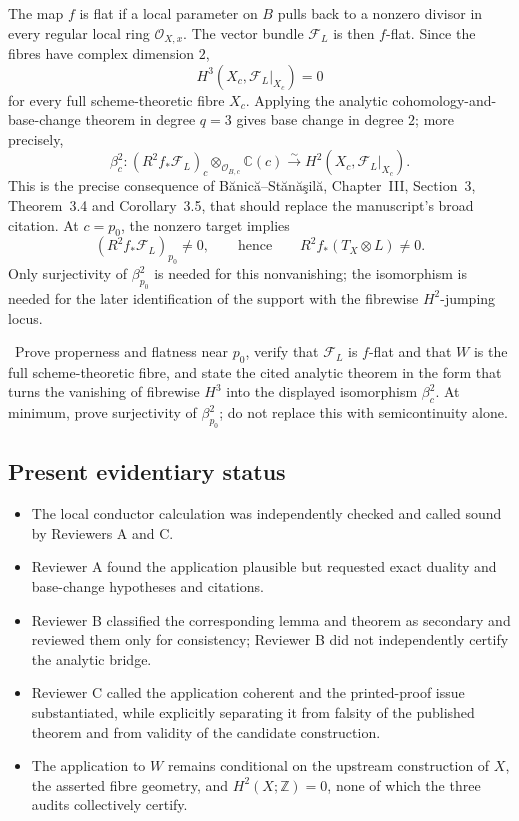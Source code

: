 The map $f$ is flat if a local parameter on $B$ pulls back to a nonzero
divisor in every regular local ring $\mathcal O_{X,x}$. The vector bundle
$\mathcal F_L$ is then $f$-flat. Since the fibres have complex dimension
$2$,
\[
 H^3(X_c,\mathcal F_L|_{X_c})=0
\]
for every full scheme-theoretic fibre $X_c$. Applying the analytic
cohomology-and-base-change theorem in degree $q=3$ gives base change in
degree $2$; more precisely,
\[
 \beta^2_c:
 (R^2f_*\mathcal F_L)_c\otimes_{\mathcal O_{B,c}}\mathbb C(c)
 \xrightarrow{\sim}
 H^2(X_c,\mathcal F_L|_{X_c}).
\]
This is the precise consequence of
B\u{a}nic\u{a}--St\u{a}n\u{a}\c{s}il\u{a}, Chapter~III,
Section~3, Theorem~3.4 and Corollary~3.5, that should replace the
manuscript's broad citation. At $c=p_0$, the nonzero target implies
\[
 (R^2f_*\mathcal F_L)_{p_0}\ne0,
 \qquad\text{hence}\qquad
 R^2f_*(T_X\otimes L)\ne0.
\]
Only surjectivity of $\beta^2_{p_0}$ is needed for this nonvanishing; the
isomorphism is needed for the later identification of the support with the
fibrewise $H^2$-jumping locus.

\begin{obligation}\label{obl:base-change}
\Open\ Prove properness and flatness near $p_0$, verify that
$\mathcal F_L$ is $f$-flat and that $W$ is the full scheme-theoretic
fibre, and state the cited analytic theorem in the form that turns the
vanishing of fibrewise $H^3$ into the displayed isomorphism $\beta^2_c$.
At minimum, prove surjectivity of $\beta^2_{p_0}$; do not replace this with
semicontinuity alone.
\end{obligation}

\subsection{Present evidentiary status}

\begin{itemize}
\item The local conductor calculation was independently checked and called
sound by Reviewers A and C.
\item Reviewer A found the application plausible but requested exact
duality and base-change hypotheses and citations.
\item Reviewer B classified the corresponding lemma and theorem as
secondary and reviewed them only for consistency; Reviewer B did not
independently certify the analytic bridge.
\item Reviewer C called the application coherent and the printed-proof
issue substantiated, while explicitly separating it from falsity of the
published theorem and from validity of the candidate construction.
\item The application to $W$ remains conditional on the upstream
construction of $X$, the asserted fibre geometry, and
$H^2(X;\mathbb Z)=0$, none of which the three audits collectively certify.
\end{itemize}

